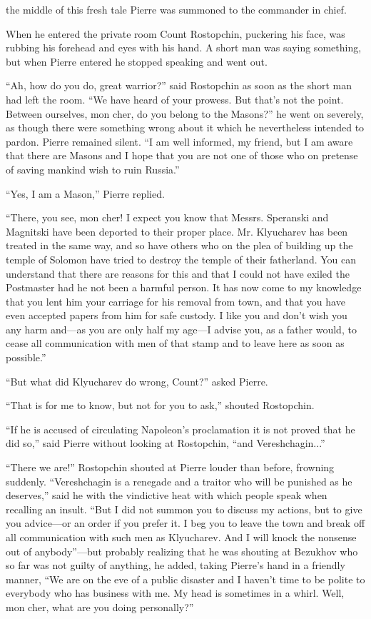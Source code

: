  the middle of this fresh tale Pierre was summoned to the
commander in chief.

When he entered the private room Count Rostopchin, puckering his
face, was rubbing his forehead and eyes with his hand. A short
man was saying something, but when Pierre entered he stopped
speaking and went out.

``Ah, how do you do, great warrior?'' said Rostopchin as soon as
the short man had left the room. ``We have heard of your
prowess. But that's not the point. Between ourselves, mon cher,
do you belong to the Masons?'' he went on severely, as though
there were something wrong about it which he nevertheless
intended to pardon. Pierre remained silent. ``I am well informed,
my friend, but I am aware that there are Masons and I hope that
you are not one of those who on pretense of saving mankind wish
to ruin Russia.''

``Yes, I am a Mason,'' Pierre replied.

``There, you see, mon cher! I expect you know that
Messrs. Speranski and Magnitski have been deported to their
proper place. Mr. Klyucharev has been treated in the same way,
and so have others who on the plea of building up the temple of
Solomon have tried to destroy the temple of their fatherland. You
can understand that there are reasons for this and that I could
not have exiled the Postmaster had he not been a harmful
person. It has now come to my knowledge that you lent him your
carriage for his removal from town, and that you have even
accepted papers from him for safe custody. I like you and don't
wish you any harm and---as you are only half my age---I advise
you, as a father would, to cease all communication with men of
that stamp and to leave here as soon as possible.''

``But what did Klyucharev do wrong, Count?'' asked Pierre.

``That is for me to know, but not for you to ask,'' shouted
Rostopchin.

``If he is accused of circulating Napoleon's proclamation it is
not proved that he did so,'' said Pierre without looking at
Rostopchin, ``and Vereshchagin...''

``There we are!'' Rostopchin shouted at Pierre louder than
before, frowning suddenly. ``Vereshchagin is a renegade and a
traitor who will be punished as he deserves,'' said he with the
vindictive heat with which people speak when recalling an
insult. ``But I did not summon you to discuss my actions, but to
give you advice---or an order if you prefer it. I beg you to
leave the town and break off all communication with such men as
Klyucharev. And I will knock the nonsense out of anybody''---but
probably realizing that he was shouting at Bezukhov who so far
was not guilty of anything, he added, taking Pierre's hand in a
friendly manner, ``We are on the eve of a public disaster and I
haven't time to be polite to everybody who has business with
me. My head is sometimes in a whirl. Well, mon cher, what are you
doing personally?''

